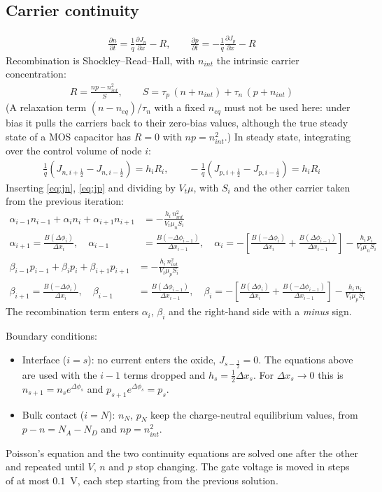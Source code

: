 \documentclass[11pt]{article}
\newcommand{\dphi}[1]{\Delta\phi_{#1}}
\newcommand{\half}{\tfrac{1}{2}}
\begin{document}
\subsection{Carrier continuity}
\begin{align}
\frac{\partial n}{\partial t}=\frac1q\frac{\partial J_n}{\partial x}-R,\qquad
\frac{\partial p}{\partial t}=-\frac1q\frac{\partial J_p}{\partial x}-R
\end{align}
Recombination is Shockley--Read--Hall, with $n_{int}$ the intrinsic carrier concentration:
\begin{align}
R=\frac{np-n_{int}^2}{S},\qquad S=\tau_p\,(n+n_{int})+\tau_n\,(p+n_{int}) \label{eq:srh}
\end{align}
(A relaxation term $(n-n_{eq})/\tau_n$ with a fixed $n_{eq}$ must not be used here: under bias it pulls the
carriers back to their zero-bias values, although the true steady state of a MOS capacitor has $R=0$ with
$np=n_{int}^2$.) In steady state, integrating over the control volume of node $i$:
\begin{align}
\frac1q\left(J_{n,i+\half}-J_{n,i-\half}\right)=h_iR_i,\qquad
-\frac1q\left(J_{p,i+\half}-J_{p,i-\half}\right)=h_iR_i
\end{align}
Inserting \eqref{eq:jn}, \eqref{eq:jp} and dividing by $V_t\mu$, with $S_i$ and the other carrier taken
from the previous iteration:
\begin{align}
\alpha_{i-1}n_{i-1}+\alpha_in_i+\alpha_{i+1}n_{i+1} &= -\frac{h_i\,n_{int}^2}{V_t\mu_nS_i}\\
\alpha_{i+1}=\frac{B(\dphi{i})}{\Delta x_i},\quad
\alpha_{i-1}&=\frac{B(-\dphi{i-1})}{\Delta x_{i-1}},\quad
\alpha_i=-\left[\frac{B(-\dphi{i})}{\Delta x_i}+\frac{B(\dphi{i-1})}{\Delta x_{i-1}}\right]-\frac{h_i\,p_i}{V_t\mu_nS_i}
\end{align}
\begin{align}
\beta_{i-1}p_{i-1}+\beta_ip_i+\beta_{i+1}p_{i+1} &= -\frac{h_i\,n_{int}^2}{V_t\mu_pS_i}\\
\beta_{i+1}=\frac{B(-\dphi{i})}{\Delta x_i},\quad
\beta_{i-1}&=\frac{B(\dphi{i-1})}{\Delta x_{i-1}},\quad
\beta_i=-\left[\frac{B(\dphi{i})}{\Delta x_i}+\frac{B(-\dphi{i-1})}{\Delta x_{i-1}}\right]-\frac{h_i\,n_i}{V_t\mu_pS_i}
\end{align}
The recombination term enters $\alpha_i$, $\beta_i$ and the right-hand side with a \emph{minus} sign.

Boundary conditions:
\begin{itemize}
\item Interface ($i=s$): no current enters the oxide, $J_{s-\half}=0$. The equations above are used with the
$i-1$ terms dropped and $h_s=\half\Delta x_s$. For $\Delta x_s\to0$ this is $n_{s+1}=n_se^{\dphi{s}}$ and
$p_{s+1}e^{\dphi{s}}=p_s$.
\item Bulk contact ($i=N$): $n_N$, $p_N$ keep the charge-neutral equilibrium values, from
$p-n=N_A-N_D$ and $np=n_{int}^2$.
\end{itemize}
Poisson's equation and the two continuity equations are solved one after the other and repeated until
$V$, $n$ and $p$ stop changing. The gate voltage is moved in steps of at most $0.1$~V, each step starting
from the previous solution.
\end{document}
